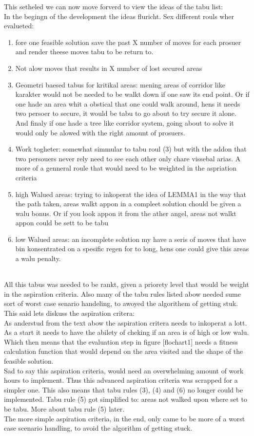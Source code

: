 This setheled we can now move forverd to view the ideas of the tabu list:\\
In the begingn of the development the ideas fluricht. Sex different rouls wher evalueted:
\begin{enumerate}
\item fore one feasible solution save the past X number of moves for each prosuer and render theese moves tabu to be return to.
\item Not alow moves that results in X number of lost secured areas
\item Geometri baesed tabus for kritikal areas:
\subitem mening areas of corridor like karakter would not be needed to be walkt down if one saw its end point. Or if one hade an area whit a obstical that one could walk around, hens it needs two persoer to secure,  it would be tabu to go about to try secure it alone. And finaly if one hade a tree like corridor system, going about to solve it would only be alowed with the right amount of prosuers.
\item Work togheter:
\subitem somewhat simmular to tabu roul (3) but with the addon that two persouers never rely need to see each other only chare vissebal arias. A more of a genneral roule that would need to be weighted in the aspriation criteria
\item high Walued areas:
\subitem trying to inkoperat the idea of  LEMMA1 in the way that the path taken, areas walkt appon in a compleet solution chould be given a walu bonus. Or if you look appon it from the ather angel, areas not walkt appon could be sett to be tabu 
\item low Walued areas:
\subitem an incomplete solution my have a seris of moves that have bin konsentrated on a spesific regen for to long, hens one could give this areas a walu penalty.
\end{enumerate}
\\
All this tabus was needed to be rankt, given a priorety level that would be weight in the aspiration criteria. Also many of the tabu rules listed abow needed sume sort of worst case senario handeling, to awoyed the algorithem of getting stuk.\\

This said lets diskuss the aspiration critera:\\
As anderstud from the text abow the aspiration critera needs to inkoperat a lott. As a start it needs to have the abilety of cheking if an area is of high or low walu. Which then means that the evaluation step in figure [flochart1] needs a fitness calculation function that would depend on the area visited and the shape of the feasible solution.\\
Sad to say this aspiration criteria, would need an overwhelming amount of work hours to implement. Thus this advanced aspiration criteria was scrapped for a simpler one. This also means that tabu rules (3), (4) and (6) no longer could be implemented. Tabu rule (5) got simplified to: areas not walked upon where set to be tabu. More about tabu rule (5) later.\\
The more simple aspiration criteria, in the end, only came to be more of a worst case scenario handling, to avoid the algorithm of getting stuck.\\

